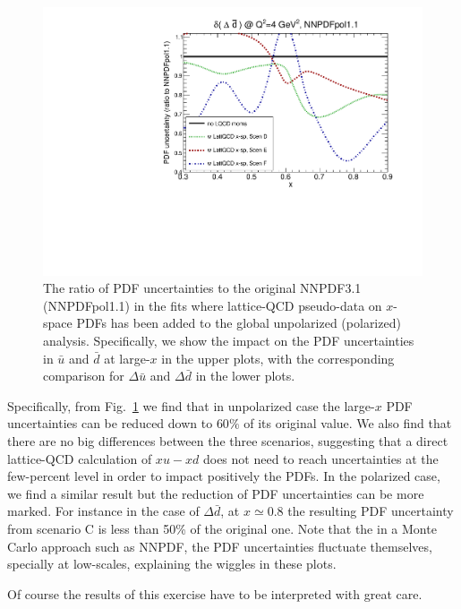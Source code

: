 \begin{figure}[!t]
\includegraphics[scale=0.45]{plots/xdbar-pol-lattice-relerr-xdata-xspace.pdf}
\caption{\small The ratio of PDF uncertainties to the original
  NNPDF3.1 (NNPDFpol1.1) in the fits where lattice-QCD pseudo-data
  on $x$-space PDFs has been added to the global unpolarized
  (polarized) analysis.
  Specifically, we show the impact on the PDF uncertainties
  in $\bar{u}$ and $\bar{d}$ at large-$x$ in the upper
  plots, with the corresponding comparison for $\Delta\bar{u}$
  and $\Delta\bar{d}$ in the lower plots.
}    
\label{fig:impactxspace}
\end{figure}

Specifically, from Fig.~\ref{fig:impactxspace} we find that
in unpolarized case the large-$x$ PDF uncertainties can be reduced
down to $60\%$ of its original value.
%
We also find that there are no big differences between the three
scenarios, suggesting that a direct lattice-QCD calculation
of $xu-xd$ does not need to reach uncertainties
at the few-percent level in order to impact positively
the PDFs.
%
In the polarized case, we find a similar result but the reduction
of PDF uncertainties can be more marked.
%
For instance in the case of $\Delta \bar{d}$, at $x\simeq 0.8$
the resulting PDF uncertainty from scenario C is less than 50\%
of the original one.
%
Note that the in a Monte Carlo approach such as NNPDF, the
PDF uncertainties fluctuate themselves, specially at low-scales,
explaining the wiggles in these plots.


Of course the results of this exercise have to be interpreted
with great care. 
